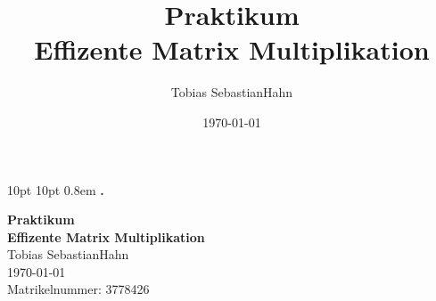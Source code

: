 \documentclass[11pt,a4paper,headsepline,notitlepage,cleardoubleempty,BCOR=20mm,twoside,DIV=12]{scrreprt}
\newcommand{\thema}{Effizente Matrix Multiplikation}
\newcommand{\artderarbeit}{Praktikum}
\newcommand{\dasdatum}{\today}
\newcommand{\studentname}{Hahn}
\newcommand{\studentvorname}{Tobias Sebastian}
\newcommand{\matrikelnummer}{3778426}
\newcommand{\student}{\studentvorname\text{ }\studentname}
\begin{document}
 
\theoremstyle{definition}
\newtheorem*{Proof}{Proof}
\newtheorem{Lemma}{Lemma}

\newtheorem{Prop}{Proposition}
{10pt}%
{10pt}%
{\itshape}%
{}%
{\bfseries}%
{}%
{0.8em}%
{\bfseries{.}}%
\theoremstyle{kursiv}
\newtheorem{thmL}{Definition}


\date{\dasdatum}

\title{\small{\artderarbeit} \\ \Large{\textbf{\thema}}}
\author{\student}


\begin{titlepage}
        \vspace*{\bigskipamount}
        \begin{center}
                \noindent \textbf{\LARGE{\artderarbeit}}\\[4ex]
                \noindent%
                \textbf{%
                                \huge{%
                                \thema
                        }
                }\\[10ex]
                \Large \student\\[0.5ex]
		\Large \today\\[4ex]
		\Large Matrikelnummer: \matrikelnummer
        \end{center}
\begin{flushleft}
\vfill
\end{flushleft}
\end{titlepage}
\clearpage

\newpage
\thispagestyle{empty}

\vfill


\newpage 

\newpage
\mbox{} \thispagestyle{empty}
\newpage
\tableofcontents
\newpage
 
\quad
\newpage










			
\end{document}
